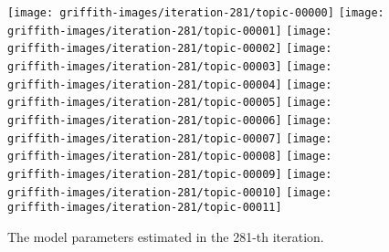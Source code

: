 \begin{figure}[!t]
  \centering
  \texttt{[image: griffith-images/iteration-281/topic-00000]}
  \texttt{[image: griffith-images/iteration-281/topic-00001]}
  \texttt{[image: griffith-images/iteration-281/topic-00002]}
  \texttt{[image: griffith-images/iteration-281/topic-00003]}
  \texttt{[image: griffith-images/iteration-281/topic-00004]}
  \texttt{[image: griffith-images/iteration-281/topic-00005]}
  \texttt{[image: griffith-images/iteration-281/topic-00006]}
  \texttt{[image: griffith-images/iteration-281/topic-00007]}
  \texttt{[image: griffith-images/iteration-281/topic-00008]}
  \texttt{[image: griffith-images/iteration-281/topic-00009]}
  \texttt{[image: griffith-images/iteration-281/topic-00010]}
  \texttt{[image: griffith-images/iteration-281/topic-00011]}
  \caption{The model parameters estimated in the 281-th iteration.}
  \label{fig:learned-shengxiao}
\end{figure}

